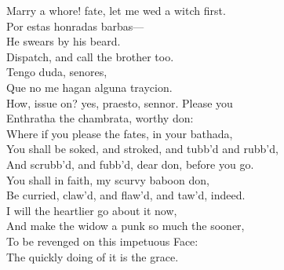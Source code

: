 \documentclass[a4paper,oneside]{memoir}
\begin{document}
\begin{drama*}
Marry a whore! fate, let me wed a witch first.\\
\surlyspeaks Por estas honradas barbas---\\
\subtlespeaks {} He swears by his beard.\\
Dispatch, and call the brother too.\\
\surlyspeaks {} Tengo duda, senores,\\
Que no me hagan alguna traycion.\\
\subtlespeaks How, issue on? yes, praesto, sennor. Please you\\
Enthratha the chambrata, worthy don:\\
Where if you please the fates, in your bathada,\\
You shall be soked, and stroked, and tubb'd and rubb'd,\\
And scrubb'd, and fubb'd, dear don, before you go.\\
You shall in faith, my scurvy baboon don,\\
Be curried, claw'd, and flaw'd, and taw'd, indeed.\\
I will the heartlier go about it now,\\
And make the widow a punk so much the sooner,\\
To be revenged on this impetuous Face:\\
The quickly doing of it is the grace.\\
\scene


\end{drama*}
\end{document}
